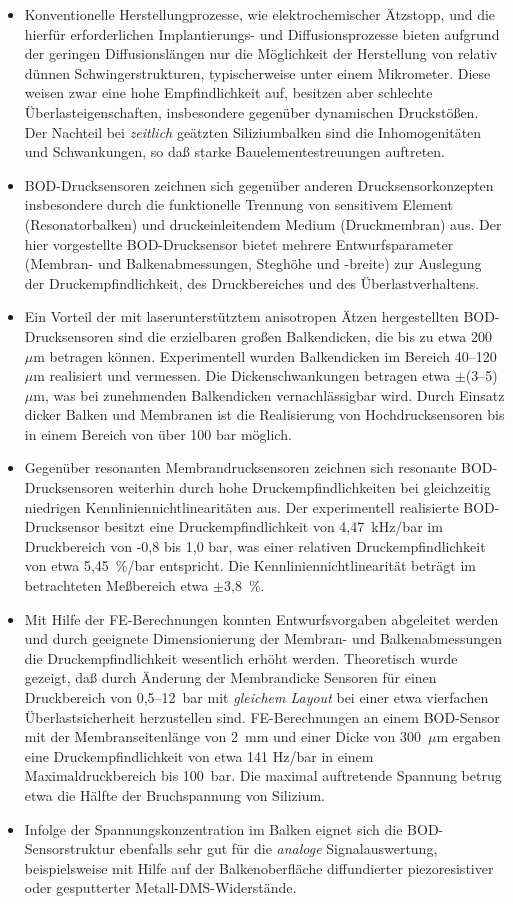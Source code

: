 \begin{itemize}
\item
Konventionelle Herstellungprozesse, wie elektrochemischer Ätzstopp,
und die hierfür erforderlichen Implantierungs- und Diffusionsprozesse
bieten aufgrund der geringen Diffusionslängen nur die Möglichkeit
der Herstellung von relativ dünnen Schwingerstrukturen, typischerweise
unter einem Mikrometer. Diese weisen zwar eine hohe Empfindlichkeit auf,
besitzen aber schlechte Überlasteigenschaften, insbesondere gegenüber
dynamischen Druckstößen. Der Nachteil bei {\em zeitlich} geätzten
Siliziumbalken sind die Inhomogenitäten und Schwankungen, so daß starke
Bauelementestreuungen auftreten.
\item
BOD-Drucksensoren zeichnen sich gegenüber anderen Drucksensorkonzepten
insbesondere durch die funktionelle Trennung von sensitivem Element
(Resonatorbalken) und druckeinleitendem Medium (Druckmembran) aus.
Der hier vorgestellte BOD-Drucksensor bietet mehrere Entwurfsparameter
(Membran- und Balkenabmessungen, Steghöhe und -breite) zur Auslegung der
Druckempfindlichkeit, des Druckbereiches und des Überlastverhaltens.
\item
Ein Vorteil der mit laserunterstütztem anisotropen Ätzen hergestellten
BOD-Drucksensoren sind die erzielbaren großen Balkendicken, die bis zu
etwa 200~$\mu$m betragen können. Experimentell wurden Balkendicken im
Bereich 40--120~$\mu$m realisiert und vermessen. Die Dickenschwankungen
betragen etwa $\pm$(3--5)~$\mu$m, was bei zunehmenden Balkendicken
vernachlässigbar wird. Durch Einsatz dicker Balken und Membranen ist die
Realisierung von Hochdrucksensoren bis in einem Bereich von über 100
bar möglich.
\item
Gegenüber resonanten Membrandrucksensoren zeichnen sich resonante
BOD-Drucksensoren weiterhin durch hohe Druckempfindlichkeiten bei
gleichzeitig niedrigen Kennliniennichtlinearitäten aus. Der experimentell
realisierte BOD-Drucksensor besitzt eine Druckempfindlichkeit von
4,47~kHz/bar im Druckbereich von -0,8 bis 1,0 bar, was einer relativen
Druckempfindlichkeit von etwa 5,45~\%/bar entspricht. Die
Kennliniennichtlinearität beträgt im betrachteten Meßbereich
etwa $\pm$3,8~\%.
\item
Mit Hilfe der FE-Berechnungen konnten Entwurfsvorgaben abgeleitet
werden und durch geeignete Dimensionierung der Membran- und
Balkenabmessungen die Druckempfindlichkeit wesentlich erhöht werden.
Theoretisch wurde gezeigt, daß durch Änderung der Membrandicke
Sensoren für einen Druckbereich von 0,5--12~bar mit {\em gleichem Layout}
bei einer etwa vierfachen Überlastsicherheit herzustellen sind.
FE-Berechnungen an einem BOD-Sensor mit der Membranseitenlänge
von 2~mm und einer Dicke von 300~$\mu$m ergaben eine Druckempfindlichkeit
von etwa 141 Hz/bar in einem Maximaldruckbereich bis 100~bar. Die maximal
auftretende Spannung betrug etwa die Hälfte der Bruchspannung von Silizium.
\item
Infolge der Spannungskonzentration im Balken eignet sich die
BOD-Sensorstruktur ebenfalls sehr gut für die {\em analoge}
Signalauswertung, beispielsweise mit Hilfe auf der Balkenoberfläche
diffundierter piezoresistiver oder gesputterter Metall-DMS-Widerstände.
\end{itemize}
%
